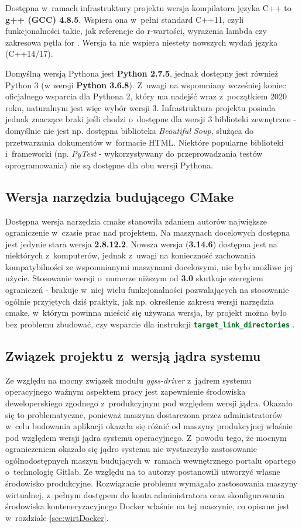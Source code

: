Dostępna w~ramach infrastruktury projektu wersja kompilatora języka C++ to \textbf{g++ (GCC) 4.8.5}. Wspiera ona w~pełni standard C++11, czyli funkcjonalności takie, jak referencje do r-wartości, wyrażenia lambda czy zakresowa pętla for \cite{GCC48}. Wersja ta nie wspiera niestety nowszych wydań języka (C++14/17). \par

Domyślną wersją Pythona jest \textbf{Python 2.7.5}, jednak dostępny jest również Python 3 (w wersji \textbf{Python 3.6.8}). Z~uwagi na wspomniany wcześniej koniec oficjalnego wsparcia dla Pythona 2, który ma nadejść wraz z~początkiem 2020 roku, naturalnym jest więc wybór wersji 3. Infrastruktura projektu posiada jednak znaczące braki jeśli chodzi o~dostępne dla wersji 3 biblioteki zewnętrzne - domyślnie nie jest np. dostępna biblioteka \textit{Beautiful Soup}, służąca do przetwarzania dokumentów w~formacie HTML. Niektóre popularne biblioteki i~frameworki (np. \textit{PyTest} \cite{PyTestMain} - wykorzystywany do przeprowadzania testów oprogramowania) nie są dostępne dla obu wersji Pythona.

\subsection{Wersja narzędzia budującego CMake}
Dostępna wersja narzędzia \gls*{cmake} stanowiła zdaniem autorów największe ograniczenie w~czasie prac nad projektem. Na maszynach docelowych dostępna jest jedynie stara wersja \textbf{2.8.12.2}. Nowsza wersja (\textbf{3.14.6}) dostępna jest na niektórych z~komputerów, jednak z~uwagi na konieczność zachowania kompatybilności ze wspomnianymi maszynami docelowymi, nie było możliwe jej użycie. Stosowanie wersji o~numerze niższym od \textbf{3.0} skutkuje szeregiem ograniczeń - brakuje w~niej wielu funkcjonalności pozwalających na stosowanie ogólnie przyjętych dziś praktyk, jak np. określenie zakresu wersji narzędzia \gls*{cmake}, w~którym powinna mieścić się używana wersja, by projekt można było bez problemu zbudować, czy wsparcie dla instrukcji \lstinline[language=cmake]{target_link_directories} \cite{NewInCMake}.

\subsection{Związek projektu z~wersją jądra systemu}
Ze względu na mocny związek modułu \textit{ggss-driver} z~jądrem systemu operacyjnego ważnym aspektem pracy jest zapewnienie środowiska deweloperskiego zgodnego z~produkcyjnym pod względem wersji jądra. Okazało się to problematyczne, ponieważ maszyna dostarczona przez administratorów w~celu budowania aplikacji okazała się różnić od maszyny produkcyjnej właśnie pod względem wersji jądra systemu operacyjnego. Z~powodu tego, że mocnym ograniczeniem okazało się jądro systemu nie wystarczyło zastosowanie ogólnodostępnych maszyn budujących w~ramach wewnętrznego portalu opartego o~technologię Gitlab. Ze względu na to autorzy postanowili utworzyć własne środowisko produkcyjne. Rozwiązanie problemu wymagało zastosowania maszyny wirtualnej, z~pełnym dostępem do konta administratora oraz skonfigurowania środowiska konteneryzacyjnego Docker właśnie na tej maszynie, co opisane jest w~rozdziale \ref{sec:wirtDocker}.


